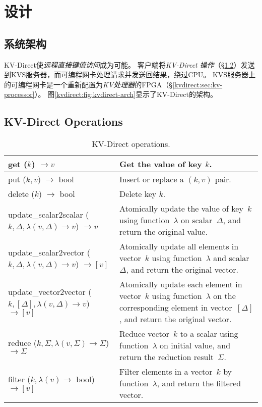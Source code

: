 \section{设计}
\label{kvdirect:sec:architecture}

\subsection{系统架构}

KV-Direct使\textit {远程直接键值访问}成为可能。
客户端将\textit {KV-Direct 操作}（\S \ref {kvdirect:sec:kv-operations}）发送到KVS服务器，而可编程网卡处理请求并发送回结果，绕过CPU。
KVS服务器上的可编程网卡是一个重新配置为\textit {KV处理器}的FPGA（\S \ref {kvdirect:sec:kv-processor}）。
图\ref {kvdirect:fig:kvdirect-arch}显示了KV-Direct的架构。

\subsection{KV-Direct Operations}
\label{kvdirect:sec:kv-operations}

\begin{table}
\centering
\caption{KV-Direct operations.}
\label{kvdirect:tab:kv-operations}

\small
\begin{tabular}{p{}|p{} }
\toprule
get ($k$) $\rightarrow v$ & Get the value of key $k$. \\
\midrule
put ($k, v$) $\rightarrow$ bool & Insert or replace a $(k, v)$ pair. \\
\midrule
delete ($k$) $\rightarrow$ bool & Delete key $k$. \\
\midrule
\midrule
update{\_}scalar2scalar ($k, \Delta, \lambda(v, \Delta) \rightarrow v$) $\rightarrow v$ & Atomically update the value of key~$k$ using function~$\lambda$ on scalar~$\Delta$, and return the original value. \\
\midrule
update{\_}scalar2vector ($k, \Delta, \lambda(v, \Delta) \rightarrow v$) $\rightarrow [v]$ & Atomically update all elements in vector~$k$ using function~$\lambda$ and scalar~$\Delta$, and return the original vector. \\
\midrule
update{\_}vector2vector ($k, [\Delta], \lambda(v, \Delta) \rightarrow v$) $\rightarrow [v]$ & Atomically update each element in vector~$k$ using function~$\lambda$ on the corresponding element in vector~$[\Delta]$, and return the original vector. \\
\midrule
reduce ($k, \Sigma, \lambda(v, \Sigma) \rightarrow \Sigma$) $\rightarrow \Sigma$ & Reduce vector~$k$ to a scalar using function~$\lambda$ on initial value, and return the reduction result~$\Sigma$. \\
\midrule
filter ($k, \lambda(v) \rightarrow$ bool) $\rightarrow [v]$ & Filter elements in a vector~$k$ by function~$\lambda$, and return the filtered vector. \\
\bottomrule
\end{tabular}

\end{table}

